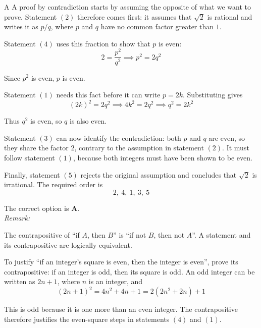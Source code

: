 \documentclass[11pt,a4paper]{article}
\begin{document}
\begin{enumerate}[label=\textbf{\arabic*.},leftmargin=*,itemsep=0pt,start=5]
\begin{djsSolution}{A}
A proof by contradiction starts by assuming the opposite of what we want to prove. Statement $(2)$ therefore comes first: it assumes that $\sqrt{2}$ is rational and writes it as $p/q$, where $p$ and $q$ have no common factor greater than $1$.

Statement $(4)$ uses this fraction to show that $p$ is even:
\[
2=\frac{p^2}{q^2}\implies p^2=2q^2
\]

Since $p^2$ is even, $p$ is even.

Statement $(1)$ needs this fact before it can write $p=2k$. Substituting gives
\[
(2k)^2=2q^2\implies 4k^2=2q^2\implies q^2=2k^2
\]

Thus $q^2$ is even, so $q$ is also even.

Statement $(3)$ can now identify the contradiction: both $p$ and $q$ are even, so they share the factor $2$, contrary to the assumption in statement $(2)$. It must follow statement $(1)$, because both integers must have been shown to be even.

Finally, statement $(5)$ rejects the original assumption and concludes that $\sqrt{2}$ is irrational. The required order is
\[
\boxed{2,\ 4,\ 1,\ 3,\ 5}
\]

The correct option is \textbf{A}.\\[5pt]

\textit{Remark:}

The contrapositive of ``if $A$, then $B$'' is ``if not $B$, then not $A$''. A statement and its contrapositive are logically equivalent.

To justify ``if an integer's square is even, then the integer is even'', prove its contrapositive: if an integer is odd, then its square is odd. An odd integer can be written as $2n+1$, where $n$ is an integer, and
\[
(2n+1)^2=4n^2+4n+1=2(2n^2+2n)+1
\]

This is odd because it is one more than an even integer. The contrapositive therefore justifies the even-square steps in statements $(4)$ and $(1)$.
\end{djsSolution}
\end{enumerate}
\clearpage
\thispagestyle{djssolutions}
\vspace*{8pt}
\end{document}

